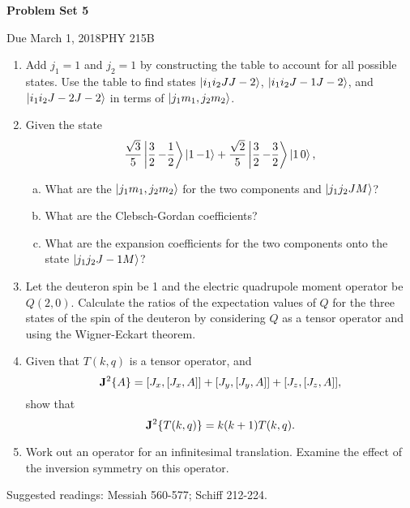 \documentclass{article}
\newcommand{\Title}     {Problem Set 5}
\newcommand{\DueDate}   {March 1, 2018}
\newcommand{\Course}    {PHY 215B}
\begin{document}
{\huge\textbf{\Title}}

Due \DueDate \hfill \Course

\hrulefill

\begin{enumerate}%
    \item Add $j_1=1$ and $j_2=1$ by constructing the table to account for all possible states. Use the table to find states $\ket{i_1i_2JJ-2}$, $\ket{i_1i_2J-1J-2}$, and $\ket{i_1i_2J-2J-2}$ in terms of $\ket{j_1m_1,j_2m_2}$.

    \item Given the state
    \[
        \frac{\sqrt{3}}{5}\ket{\frac{3}{2}\,{-\frac{1}{2}}}\ket{1\,{-1}} + \frac{\sqrt{2}}{5}\ket{\frac{3}{2}\,{-\frac{3}{2}}}\ket{1\,{0}},
    \]
    \begin{enumerate}[(a)]
        \item What are the $\ket{j_1m_1,j_2m_2}$ for the two components and $\ket{j_1j_2JM}$?

        \item What are the Clebsch-Gordan coefficients?

        \item What are the expansion coefficients for the two components onto the state $\ket{j_1j_2J-1M}$?
    \end{enumerate}

    \item Let the deuteron spin be 1 and the electric quadrupole moment operator be $Q(2,0)$. Calculate the ratios of the expectation values of $Q$ for the three states of the spin of the deuteron by considering $Q$ as a tensor operator and using the Wigner-Eckart theorem.

    \item Given that $T(k,q)$ is a tensor operator, and
    \[
        \vb{J}^2\Bqty{A} = \comm{J_x}{\comm{J_x}{A}} + \comm{J_y}{\comm{J_y}{A}} + \comm{J_z}{\comm{J_z}{A}},
    \]
    show that
    \[
        \vb{J}^2\Bqty{T(k,q)} = k(k+1)T(k,q).
    \]

    \item Work out an operator for an infinitesimal translation. Examine the effect of the inversion symmetry on this operator.
\end{enumerate}

Suggested readings: Messiah 560-577; Schiff 212-224.
\end{document}
